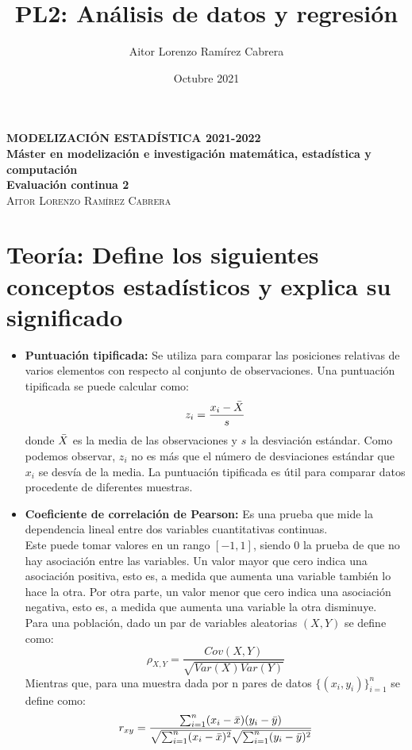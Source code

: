 \documentclass[12pt,a4paper]{article}
\title{PL2: Análisis de datos y regresión}
\author{Aitor Lorenzo Ramírez Cabrera}
\date{Octubre 2021}
\begin{document}
\begin{center}
    \textbf{MODELIZACIÓN ESTADÍSTICA 2021-2022\\ Máster en modelización e investigación matemática, estadística y computación\\[3mm] Evaluación continua 2}\\[1mm] \textsc{Aitor Lorenzo Ramírez Cabrera} \\[1mm]
\end{center}

\section{Teoría: Define los siguientes conceptos estadísticos y explica su significado}

\begin{itemize}
    \item \textbf{Puntuación tipificada:} Se utiliza para comparar las posiciones relativas de varios elementos con respecto al conjunto de observaciones. Una puntuación tipificada se puede calcular como:
    \begin{equation}
        z_i = \frac{x_i - \Bar{X}}{s}
    \end{equation}
    donde $\Bar{X}$ es la media de las observaciones y $s$ la desviación estándar. Como podemos observar, $z_i$ no es más que el número de desviaciones estándar que $x_i$ se desvía de la media. La puntuación tipificada es útil para comparar datos procedente de diferentes muestras.
    
    \item \textbf{Coeficiente de correlación de Pearson:} Es una prueba que mide la dependencia lineal entre dos variables cuantitativas continuas.\\ Este puede tomar valores en un rango $[-1,1]$, siendo 0 la prueba de que no hay asociación entre las variables. Un valor mayor que cero indica una asociación positiva, esto es, a medida que aumenta una variable también lo hace la otra. Por otra parte, un valor menor que cero indica una asociación negativa, esto es, a medida que aumenta una variable la otra disminuye.\\
    Para una población, dado un par de variables aleatorias $(X,Y)$ se define como:
    \begin{equation}
        \rho_{X,Y} = \frac{Cov(X,Y)}{\sqrt{Var(X) Var(Y)}}
    \end{equation}
    Mientras que, para una muestra dada por n pares de datos $\{(x_i, y_i)\}^n_{i=1}$ se define como:
\begin{equation}
    r_{xy} = \frac{\sum_{i=1}^n(x_i-\Bar{x})(y_i-\Bar{y})}{\sqrt{\sum_{i=1}^n(x_i-\Bar{x})^2}\sqrt{\sum_{i=1}^n(y_i-\Bar{y})^2}}
\end{equation}
    

\end{itemize}
\end{document}
